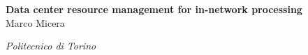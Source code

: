 \Large{\textbf{Data center resource management for in-network processing}}\\

Marco Micera\par
\textit{Politecnico di Torino}